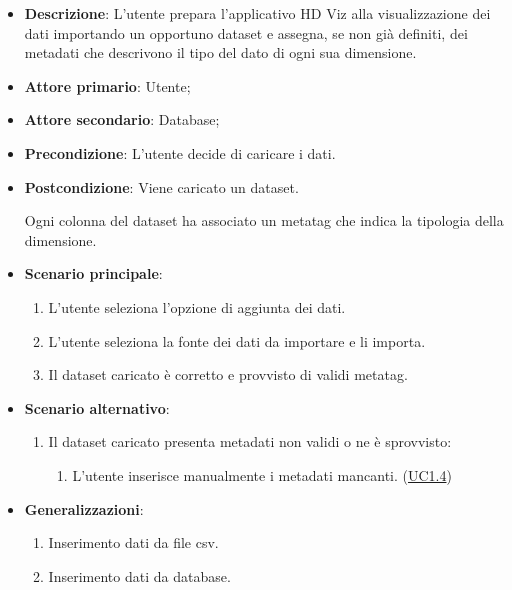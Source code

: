 \begin{itemize}
    \item \textbf{Descrizione}: L'utente prepara l'applicativo HD Viz alla visualizzazione dei dati importando un opportuno dataset e assegna, se non già definiti, dei metadati che descrivono il tipo del dato di ogni sua dimensione.
	
    \item \textbf{Attore primario}: Utente;
    \item \textbf{Attore secondario}: Database;
    
    
    \item \textbf{Precondizione}:   L'utente decide di caricare i dati.

    \item \textbf{Postcondizione}:  Viene caricato un dataset. 
    
                                    Ogni colonna del dataset ha associato
                                    un metatag che indica la tipologia della dimensione.

	\item \textbf{Scenario principale}:
		\begin{enumerate}
			\item L'utente seleziona l'opzione di aggiunta dei dati.
            \item L'utente seleziona la fonte dei dati da importare e li importa.
            \item Il dataset caricato è corretto e provvisto di validi metatag.
        \end{enumerate}
   
    \item \textbf{Scenario alternativo}:
		\begin{enumerate}
            \item Il dataset caricato presenta metadati non validi o ne è sprovvisto:
            \begin{enumerate}
                \item L'utente inserisce manualmente i metadati mancanti. (\hyperref[ssub:uc1.4]{UC1.4})
            \end{enumerate}
        \end{enumerate}

    \item \textbf{Generalizzazioni}:
    \begin{enumerate}
        \item Inserimento dati da file csv.
        \item Inserimento dati da database.
    \end{enumerate}
    

\end{itemize}
